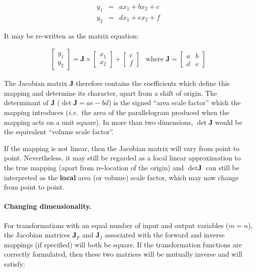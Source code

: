 \documentclass[twoside,11pt]{article}
\renewcommand{\_}{\texttt{\symbol{95}}}
\begin{document}
\begin{equation}
\begin{array}{lll}
y_1 & = & a x_1 + b x_2 + c \\
y_2 & = & d x_1 + e x_2 + f
\end{array}
\end{equation}

It may be re-written as the matrix equation:

\begin{equation}
\begin{array}{cc}
\left[ \begin{array}{c} y_1 \\ y_2 \end{array} \right]
= \mathbf{J} \times \left[ \begin{array}{c} x_1 \\ x_2 \end{array} \right]
+ \left[ \begin{array}{c} c \\ f \end{array} \right]
&
\mbox{where }
\mathbf{J} = \left[ \begin{array}{cc} a & b \\ d & e \end{array} \right]
\end{array}
\end{equation}

The Jacobian matrix $\mathbf{J}$ therefore contains the coefficients which
define this mapping and determine its character, apart from a shift of
origin.
The determinant of $\mathbf{J}$ (\mbox{\small$\det\mathbf{J}=ae-bd$})
is the signed ``area scale factor'' which the mapping introduces (\emph{i.e.}\
the area of the parallelogram produced when the mapping acts on a unit
square).
In more than two dimensions, $\det\mathbf{J}$ would be the equivalent ``volume
scale factor''.

If the mapping is not linear, then the Jacobian matrix will vary from point to
point.
Nevertheless, it may still be regarded as a local linear approximation to
the true mapping (apart from re-location of the origin) and \mbox{$\det
\textbf{J}$} can still be interpreted as the \textbf{local} area (or volume) scale
factor, which may now change from point to point.

\paragraph{Changing dimensionality.}
For transformations with an equal number of input and output variables
(\mbox{$m=n$}), the Jacobian matrices $\textbf{J}_F$ and $\textbf{J}_I$
associated
with the forward and inverse mappings (if specified) will both be square.
If the transformation functions are correctly formulated, then these two
matrices will be mutually inverse and will satisfy:
\end{document}
